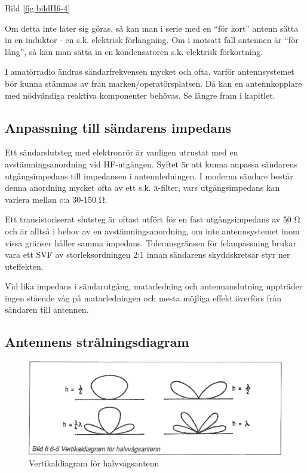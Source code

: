 Bild \ref{fig:bildII6-4}

Om detta inte låter sig göras, så kan man i serie med en ``för kort''
antenn sätta in en induktor - en s.k. elektrisk förlängning. Om i
motsatt fall antennen är ``för lång'', så kan man sätta in en
kondensatoren s.k. elektrisk förkortning.

I amatörradio ändras sändarfrekvensen mycket och ofta, varför
antennsystemet bör kunna stämmas av från marken/operatörsplatsen. Då
kan en antennkopplare med nödvändiga reaktiva komponenter behövas.  Se
längre fram i kapitlet.

\subsection{Anpassning till sändarens impedans}

Ett sändarslutsteg med elektronrör är vanligen utrustat med en
avstämningsanordning vid HF-utgången. Syftet är att kunna anpassa
sändarens utgångsimpedans till impedansen i antennledningen. I moderna
sändare består denna anordning mycket ofta av ett s.k. π-filter, vars
utgångsimpedans kan variera mellan c:a 30-150 Ω.

Ett transistoriserat slutsteg är oftast utfört för en fast
utgångsimpedans av 50 Ω och är alltså i behov av en
avstämningsanordning, om inte antennsystemet inom vissa gränser håller
samma impedans. Toleransgränsen för felanpassning brukar vara ett SVF
av storleksordningen 2:1 innan sändarens skyddskretsar styr ner
uteffekten.

Vid lika impedans i sändarutgång, matarledning och antennanslutning
uppträder ingen stående våg på matarledningen och mesta möjliga effekt
överförs från sändaren till antennen.

\subsection{Antennens strålningsdiagram}

\begin{figure}
  \includegraphics[width=\textwidth]{images/bild_2_6-05}
  \caption{Vertikaldiagram för halvvågsantenn}
  \label{fig:bildII6-5}
\end{figure}

